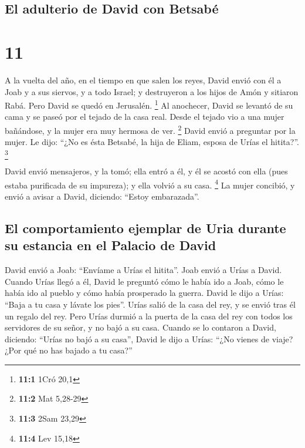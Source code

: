 \hypertarget{el-adulterio-de-david-con-betsabuxe9}{%
\subsection{El adulterio de David con
Betsabé}\label{el-adulterio-de-david-con-betsabuxe9}}

\hypertarget{section-10}{%
\section{11}\label{section-10}}

 A la vuelta del año, en el tiempo en que salen los reyes,
David envió con él a Joab y a sus siervos, y a todo Israel; y
destruyeron a los hijos de Amón y sitiaron Rabá. Pero David se quedó en
Jerusalén. \footnote{\textbf{11:1} 1Cró 20,1}  Al
anochecer, David se levantó de su cama y se paseó por el tejado de la
casa real. Desde el tejado vio a una mujer bañándose, y la mujer era muy
hermosa de ver. \footnote{\textbf{11:2} Mat 5,28-29} 
David envió a preguntar por la mujer. Le dijo: ``¿No es ésta Betsabé, la
hija de Eliam, esposa de Urías el hitita?''. \footnote{\textbf{11:3}
  2Sam 23,29}

 David envió mensajeros, y la tomó; ella entró a él, y él
se acostó con ella (pues estaba purificada de su impureza); y ella
volvió a su casa. \footnote{\textbf{11:4} Lev 15,18}  La
mujer concibió, y envió a avisar a David, diciendo: ``Estoy
embarazada''.

\hypertarget{el-comportamiento-ejemplar-de-uria-durante-su-estancia-en-el-palacio-de-david}{%
\subsection{El comportamiento ejemplar de Uria durante su estancia en el
Palacio de
David}\label{el-comportamiento-ejemplar-de-uria-durante-su-estancia-en-el-palacio-de-david}}

 David envió a Joab: ``Envíame a Urías el hitita''. Joab
envió a Urías a David.  Cuando Urías llegó a él, David le
preguntó cómo le había ido a Joab, cómo le había ido al pueblo y cómo
había prosperado la guerra.  David le dijo a Urías: ``Baja
a tu casa y lávate los pies''. Urías salió de la casa del rey, y se
envió tras él un regalo del rey.  Pero Urías durmió a la
puerta de la casa del rey con todos los servidores de su señor, y no
bajó a su casa.  Cuando se lo contaron a David, diciendo:
``Urías no bajó a su casa'', David le dijo a Urías: ``¿No vienes de
viaje? ¿Por qué no has bajado a tu casa?''

